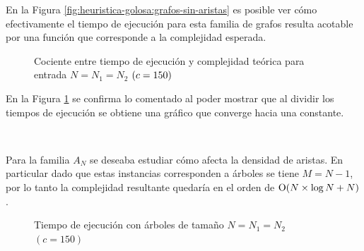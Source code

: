 En la Figura \ref{fig:heuristica-golosa:grafos-sin-aristas} es posible ver cómo
efectivamente el tiempo de ejecución para esta familia de grafos resulta
acotable por una función que corresponde a la complejidad esperada.

\begin{figure}[H]
	\centering
	\captionsetup{justification=centering, width=.7\linewidth}
	\caption{Cociente entre tiempo de ejecución y complejidad teórica para
	entrada $N = N_1 = N_2$ $(c = \constante)$}
	\label{fig:heuristica-golosa:grafos-sin-aristas-cociente}
\end{figure}

En la Figura \ref{fig:heuristica-golosa:grafos-sin-aristas-cociente} se confirma
lo comentado al poder mostrar que al dividir los tiempos de ejecución se obtiene
una gráfico que converge hacia una constante.

~

Para la familia $A_N$ se deseaba estudiar cómo afecta la densidad de aristas. En
particular dado que estas instancias corresponden a árboles se tiene $M = N -
1$, por lo tanto la complejidad resultante quedaría en el orden de
$\operatorname{O}(N \times \log N + N)$.

\renewcommand\constante{150}

\begin{figure}[H]
	\centering
	\caption{Tiempo de ejecución con árboles de tamaño $N = N_1 = N_2$ $(c = \constante)$}
	\label{fig:heuristica-golosa:arboles}
\end{figure}

